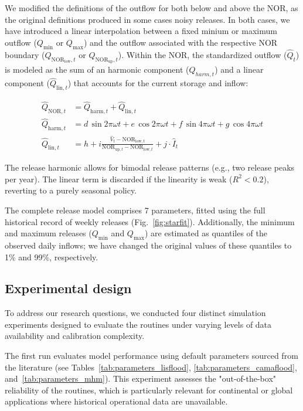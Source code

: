 \documentclass[hess, manuscript]{copernicus}
\begin{document}
We modified the definitions of the outflow for both below and above the NOR, as the original definitions produced in some cases noisy releases. In both cases, we have introduced a linear interpolation between a fixed minium or maximum outflow ($Q_{\min}$ or $Q_{\max}$) and the outflow associated  with the respective NOR boundary ($Q_{\text{NOR}_{\text{low}},t}$ or $Q_{\text{NOR}_{\text{up}},t}$). Within the NOR, the standardized outflow ($\hat{Q}_{t}$) is modeled as the sum of an harmonic component ($\hat{Q}_{harm,t}$) and a linear component  ($\hat{Q}_{\text{lin},t}$) that accounts for the current storage and inflow:

{\small
\begin{equation}
\label{eq:starfit_release_linear}
    \begin{aligned}
        \hat{Q}_{\text{NOR},t} &= \hat{Q}_{\text{harm},t} + \hat{Q}_{\text{lin},t} \\[1ex]
        \hat{Q}_{\text{harm},t} &= d \, \sin 2\pi\omega t + e \, \cos 2\pi\omega t + f \, \sin 4\pi\omega t + g \, \cos 4\pi\omega t \\[1ex]
        \hat{Q}_{\text{lin},t} &= h + i \frac{\hat{V}_{t} - \text{NOR}_{\text{low},t}}{\text{NOR}_{\text{up},t} - \text{NOR}_{\text{low},t}} + j \cdot \hat{I}_{t}
    \end{aligned}
\end{equation}
}

The release harmonic allows for bimodal release patterns (e.g., two release peaks per year). The linear term is discarded if the linearity is weak ($R^2 < 0.2$), reverting to a purely seasonal policy.

The complete release model comprises 7 parameters, fitted using the full historical record of weekly releases (Fig.~\ref{fig:starfit}). Additionally, the minimum and maximum releases ($Q_{\min}$ and $Q_{\max}$) are estimated as quantiles of the observed daily inflows; we have changed the original values of these quantiles to 1\% and 99\%, respectively.

\subsection{Experimental design}
\label{sec:experimental_design}

To address our research questions, we conducted four distinct simulation experiments designed to evaluate the routines under varying levels of data availability and calibration complexity.

The first run evaluates model performance using default parameters sourced from the literature (see Tables~\ref{tab:parameters_lisflood}, \ref{tab:parameters_camaflood}, and~\ref{tab:parameters_mhm}). This experiment assesses the "out-of-the-box" reliability of the routines, which is particularly relevant for continental or global applications where historical operational data are unavailable.
\end{document}
